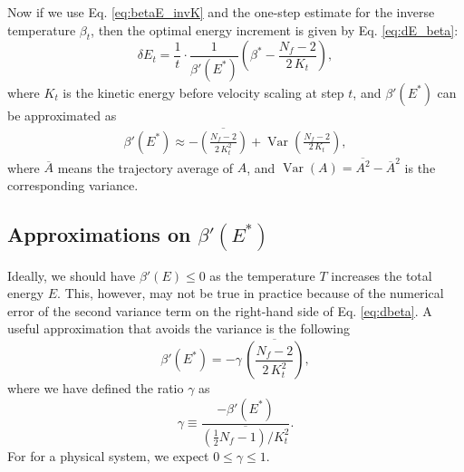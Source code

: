 \documentclass[reprint]{revtex4-1}
\begin{document}
Now if we use Eq. \eqref{eq:betaE_invK} and
the one-step estimate for the inverse temperature
$\beta_t$,
then the optimal energy increment is given by
Eq. \eqref{eq:dE_beta}:
%
\begin{equation}
\delta E_t
=
\frac{ 1 } { t } \cdot
\frac{ 1 } { \beta'(E^*) }
\left(
 \beta^* -
 \frac{ N_f - 2  }
      { 2 \, K_t }
\right)
,
\label{eq:dE_final}
\end{equation}
%
where
$K_t$ is the kinetic energy before velocity scaling at step $t$,
and $\beta'(E^*)$ can be approximated
as
%
\begin{align}
  \beta'(E^*)
  \approx
  - \overline{
    \left(
      \frac{ N_f - 2 }
           { 2 \, K_t^2 }
    \right)
    }
    +
    \operatorname{Var}
    \left(
        \frac{ N_f - 2 }
             { 2 \, K_t }
    \right)
  ,
  \label{eq:dbeta}
\end{align}
%
where
$\overline A$ means the trajectory average of $A$,
and
$\operatorname{Var}(A) = \overline{ A^2 } - {\overline A}^2$
is the corresponding variance.
%


\subsection{Approximations on $\beta'(E^*)$}


Ideally, we should have $\beta'(E) \le 0$
as the temperature $T$ increases the total energy $E$.
%
This, however, may not be true in practice
because of the numerical error of the second variance term on the right-hand side
of Eq. \eqref{eq:dbeta}.
%
%
A useful approximation that avoids the variance is the following
%
\begin{equation}
  \beta'(E^*)
  =
  -\gamma \, \overline{
    \left(
      \frac{ N_f - 2 }
           { 2 \, K_t^2 }
    \right)
    }
  ,
  \label{eq:dbeta_approx}
\end{equation}
%
where we have defined the ratio $\gamma$ as
%
\begin{equation}
  \gamma
  \equiv
  \frac
  {
    -\beta'(E^*)
  }
  {
    \overline{
      \left( \frac 1 2 N_f - 1  \right) / K_t^2
    }
  }
  .
  \label{eq:gamma_def}
\end{equation}
%
For for a physical system, we expect $0 \le \gamma \le 1$.
\end{document}
